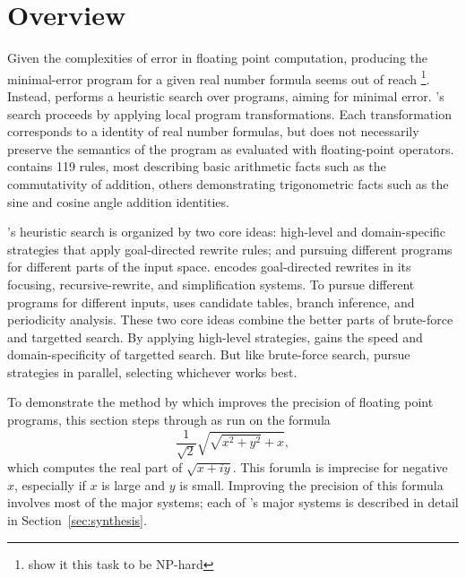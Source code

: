 \documentclass[paper.tex]{subfiles}
\begin{document}
\section{Overview}
\label{sec:overview}

Given the complexities of error in floating point computation,
  producing the minimal-error program
  for a given real number formula
  seems out of reach%
  \footnote{\cite{} show it this task to be NP-hard}.
Instead, \casio performs a heuristic search over programs,
  aiming for minimal error.
\casio's search proceeds by applying local program transformations.
Each transformation corresponds to a identity of real number formulas,
  but does not necessarily preserve the semantics of the program
  as evaluated with floating-point operators.
\casio contains 119 rules,
  most describing basic arithmetic facts
  such as the commutativity of addition,
  others demonstrating trigonometric facts
  such as the sine and cosine angle addition identities.

\casio's heuristic search is organized by two core ideas:
  high-level and domain-specific strategies
  that apply goal-directed rewrite rules;
  and pursuing different programs
  for different parts of the input space.
\casio encodes goal-directed rewrites in its
  focusing, recursive-rewrite, and simplification systems.
To pursue different programs for different inputs, \casio uses
  candidate tables, branch inference, and periodicity analysis.
These two core ideas combine the better parts
  of brute-force and targetted search.
By applying high-level strategies,
  \casio gains the speed and domain-specificity of targetted search.
But like brute-force search,
  \casio pursue strategies in parallel, selecting whichever works best.

To demonstrate the method by which
  \casio improves the precision of floating point programs,
  this section steps through \casio as run on the formula
\begin{equation}\label{eq:ex}
  \frac1{\sqrt2} \sqrt{\sqrt{x^2 + y^2} + x},
\end{equation}
  which computes the real part of $\sqrt{x + i y}$.
This forumla is imprecise for negative $x$,
  especially if $x$ is large and $y$ is small.
Improving the precision of this formula
  involves most of the major systems;
  each of \casio's major systems is described in detail
  in Section~\ref{sec:synthesis}.
\end{document}

